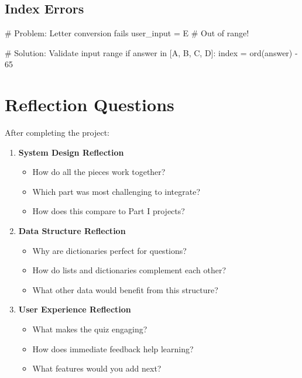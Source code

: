 \documentclass[
  letterpaper,
  DIV=11,
  numbers=noendperiod,
  oneside]{scrreprt}
\newenvironment{Shaded}{}{}
\newcommand{\BuiltInTok}[1]{\textcolor[rgb]{0.84,0.23,0.29}{#1}}
\newcommand{\CommentTok}[1]{\textcolor[rgb]{0.42,0.45,0.49}{#1}}
\newcommand{\ControlFlowTok}[1]{\textcolor[rgb]{0.84,0.23,0.29}{#1}}
\newcommand{\DecValTok}[1]{\textcolor[rgb]{0.00,0.36,0.77}{#1}}
\newcommand{\KeywordTok}[1]{\textcolor[rgb]{0.84,0.23,0.29}{#1}}
\newcommand{\NormalTok}[1]{\textcolor[rgb]{0.14,0.16,0.18}{#1}}
\newcommand{\OperatorTok}[1]{\textcolor[rgb]{0.14,0.16,0.18}{#1}}
\newcommand{\StringTok}[1]{\textcolor[rgb]{0.01,0.18,0.38}{#1}}
\providecommand{\tightlist}{%
  \setlength{\itemsep}{0pt}\setlength{\parskip}{0pt}}\usepackage{longtable,booktabs,array}
\begin{document}
\subsection{Index Errors}\label{index-errors}

\begin{Shaded}
\begin{Highlighting}[]
\CommentTok{\# Problem: Letter conversion fails}
\NormalTok{user\_input }\OperatorTok{=} \StringTok{\textquotesingle{}E\textquotesingle{}}  \CommentTok{\# Out of range!}

\CommentTok{\# Solution: Validate input range}
\ControlFlowTok{if}\NormalTok{ answer }\KeywordTok{in}\NormalTok{ [}\StringTok{\textquotesingle{}A\textquotesingle{}}\NormalTok{, }\StringTok{\textquotesingle{}B\textquotesingle{}}\NormalTok{, }\StringTok{\textquotesingle{}C\textquotesingle{}}\NormalTok{, }\StringTok{\textquotesingle{}D\textquotesingle{}}\NormalTok{]:}
\NormalTok{    index }\OperatorTok{=} \BuiltInTok{ord}\NormalTok{(answer) }\OperatorTok{{-}} \DecValTok{65}
\end{Highlighting}
\end{Shaded}

\section{Reflection Questions}\label{reflection-questions-7}

After completing the project:

\begin{enumerate}
\def\labelenumi{\arabic{enumi}.}
\tightlist
\item
  \textbf{System Design Reflection}

  \begin{itemize}
  \tightlist
  \item
    How do all the pieces work together?
  \item
    Which part was most challenging to integrate?
  \item
    How does this compare to Part I projects?
  \end{itemize}
\item
  \textbf{Data Structure Reflection}

  \begin{itemize}
  \tightlist
  \item
    Why are dictionaries perfect for questions?
  \item
    How do lists and dictionaries complement each other?
  \item
    What other data would benefit from this structure?
  \end{itemize}
\item
  \textbf{User Experience Reflection}

  \begin{itemize}
  \tightlist
  \item
    What makes the quiz engaging?
  \item
    How does immediate feedback help learning?
  \item
    What features would you add next?
  \end{itemize}
\end{enumerate}
\end{document}
